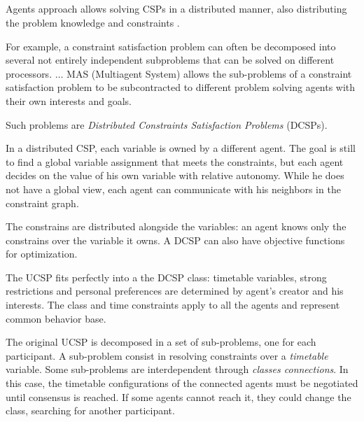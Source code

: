 \documentclass[ThesisDoc]{subfiles}
\begin{document}
\bigskip




\subsection{}
Agents approach allows solving CSPs in a distributed manner, also distributing
the problem knowledge and constraints
\cite{DCSPagent1998, DCSP2013, CSPagent2014, MAS, MAS-Survey}.

\begin{displayquote} %
  For example, a constraint satisfaction problem can often be
  decomposed into several not entirely independent
  subproblems that can be solved on different processors. $\dots$
  MAS (Multiagent System) allows the sub-problems of a constraint satisfaction
  problem to be subcontracted to different problem solving agents with their own
  interests and goals.
\end{displayquote}

\noindent
Such problems are \emph{Distributed Constraints Satisfaction Problems} (DCSPs).
\begin{displayquote} %
  In a distributed CSP, each variable is owned by a different agent. The goal is
  still to find a global variable assignment that meets the constraints, but each agent
  decides on the value of his own variable with relative autonomy. While he does
  not have a global view, each agent can communicate with his neighbors in the
  constraint graph.
\end{displayquote}

  The constrains are distributed alongside the variables: an agent knows only the
constrains over the variable it owns. A DCSP can also have objective functions for
optimization.

  The UCSP fits perfectly into a the DCSP class: timetable variables,
strong restrictions and personal preferences are determined by agent's creator
and his interests. The class and time constraints apply to all the agents and
represent common behavior base.

  The original UCSP is decomposed in a set of sub-problems, one for each participant.
A sub-problem consist in resolving constraints over a \emph{timetable} variable.
Some sub-problems are interdependent through \emph{classes connections}. In this
case, the timetable configurations of the connected agents must be negotiated
until consensus is reached. If some agents cannot reach it, they could change the
class, searching for another participant.
\end{document}
